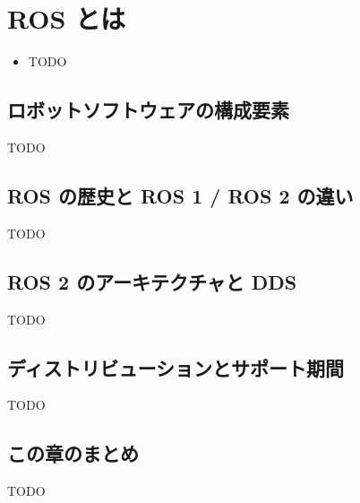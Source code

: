 \chapter{ROS とは}
\label{chap:what_is_ros}

\begin{goalbox}
  \begin{itemize}
    \item TODO
  \end{itemize}
\end{goalbox}

\section{ロボットソフトウェアの構成要素}

TODO

\section{ROS の歴史と ROS 1 / ROS 2 の違い}

TODO

\section{ROS 2 のアーキテクチャと DDS}

TODO

\section{ディストリビューションとサポート期間}

TODO

\section*{この章のまとめ}

TODO
